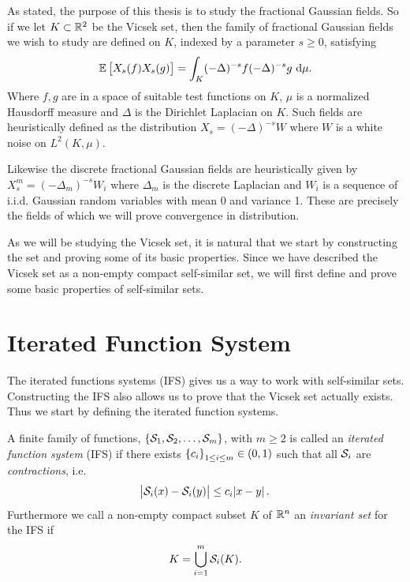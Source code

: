 As stated, the purpose of this thesis is to study the fractional Gaussian fields. So if we let $K \subset \mathbb{R}^{2}$ be the Vicsek set, then the family of fractional Gaussian fields we wish to study are defined on $K$, indexed by a parameter $s \geq 0$, satisfying
\begin{equation}
	\mathbb{E} \left[X_{s}(f)X_{s}(g)\right] = \int_{K} (-\Delta)^{-s}f(-\Delta)^{-s}g \ \text{d} \mu.
\end{equation}
Where $f,g$ are in a space of suitable test functions on $K$, $\mu$ is a normalized Hausdorff measure and $\Delta$ is the Dirichlet Laplacian on $K$. Such fields are heuristically defined as the distribution $X_s = (-\Delta)^{-s}W$ where $W$ is a white noise on $L^{2}(K, \mu)$.

Likewise the discrete fractional Gaussian fields are heuristically given by $X_{s}^{m} = (-\Delta_m)^{-s}W_i$ where $\Delta_m$ is the discrete Laplacian and $W_i$ is a sequence of i.i.d. Gaussian random variables with mean 0 and variance 1. These are precisely the fields of which we will prove convergence in distribution.

As we will be studying the Vicsek set, it is natural that we start by constructing the set and proving some of its basic properties. Since we have described the Vicsek set as a non-empty compact self-similar set, we will first define and prove some basic properties of self-similar sets.

\section{Iterated Function System}
The iterated functions systems (IFS) gives us a way to work with self-similar sets. Constructing the IFS also allows us to prove that the Vicsek set actually exists. Thus we start by defining the iterated function systems.

\medskip
\begin{defi}
	A finite family of functions, $\cbr{\fracConst_1, \fracConst_2, \ldots, \fracConst_m}$, with $m \geq 2$ is called an \emph{iterated function system} (IFS) if there exists $\cbr{c_i}_{1 \leq i \leq m} \in (0, 1)$ such that all $\mathcal{S}_i$ are \emph{contractions}, i.e.
	\begin{equation}
		\abs{\mathcal{S}_i(x) -\mathcal{S}_i(y)} \leq c_i \abs{x-y}.
	\end{equation}
	Furthermore we call a non-empty compact subset $K$ of $\mathbb{R}^{n}$ an \emph{invariant set} for the IFS if
	\begin{equation}\label{invariantSet}
		K = \bigcup_{i = 1}^{m} \mathcal{S}_i(K).
	\end{equation}
\end{defi}


